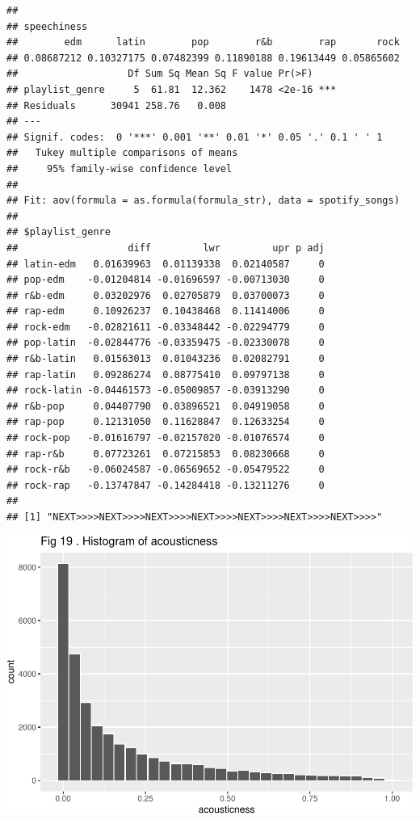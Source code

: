 \documentclass[
]{article}
\begin{document}
\begin{verbatim}
## 
## speechiness
##        edm      latin        pop        r&b        rap       rock 
## 0.08687212 0.10327175 0.07482399 0.11890188 0.19613449 0.05865602 
##                   Df Sum Sq Mean Sq F value Pr(>F)    
## playlist_genre     5  61.81  12.362    1478 <2e-16 ***
## Residuals      30941 258.76   0.008                   
## ---
## Signif. codes:  0 '***' 0.001 '**' 0.01 '*' 0.05 '.' 0.1 ' ' 1
##   Tukey multiple comparisons of means
##     95% family-wise confidence level
## 
## Fit: aov(formula = as.formula(formula_str), data = spotify_songs)
## 
## $playlist_genre
##                   diff         lwr         upr p adj
## latin-edm   0.01639963  0.01139338  0.02140587     0
## pop-edm    -0.01204814 -0.01696597 -0.00713030     0
## r&b-edm     0.03202976  0.02705879  0.03700073     0
## rap-edm     0.10926237  0.10438468  0.11414006     0
## rock-edm   -0.02821611 -0.03348442 -0.02294779     0
## pop-latin  -0.02844776 -0.03359475 -0.02330078     0
## r&b-latin   0.01563013  0.01043236  0.02082791     0
## rap-latin   0.09286274  0.08775410  0.09797138     0
## rock-latin -0.04461573 -0.05009857 -0.03913290     0
## r&b-pop     0.04407790  0.03896521  0.04919058     0
## rap-pop     0.12131050  0.11628847  0.12633254     0
## rock-pop   -0.01616797 -0.02157020 -0.01076574     0
## rap-r&b     0.07723261  0.07215853  0.08230668     0
## rock-r&b   -0.06024587 -0.06569652 -0.05479522     0
## rock-rap   -0.13747847 -0.14284418 -0.13211276     0
## 
## [1] "NEXT>>>>NEXT>>>>NEXT>>>>NEXT>>>>NEXT>>>>NEXT>>>>NEXT>>>>"
\end{verbatim}

\includegraphics{Final-Report_files/figure-latex/unnamed-chunk-14-15.pdf}
\end{document}
